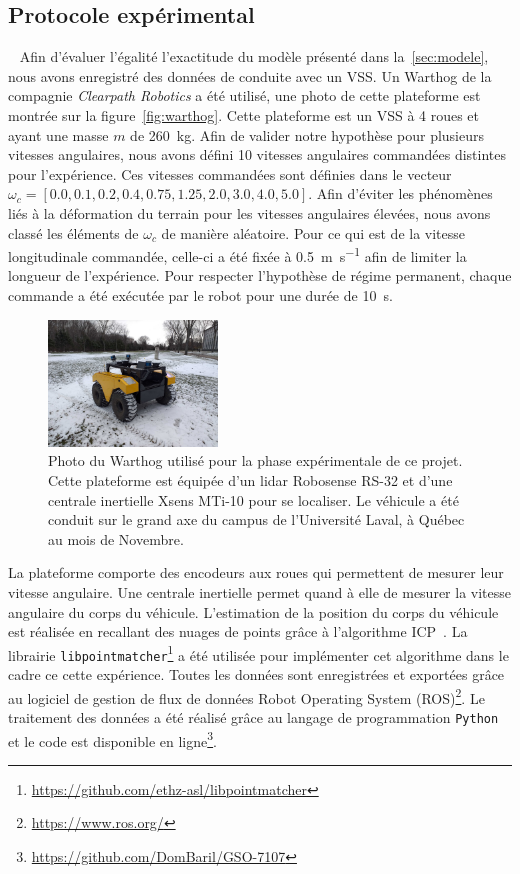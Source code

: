 \subsection{Protocole expérimental}~\label{sec:protocole}
Afin d'évaluer l'égalité l'exactitude du modèle présenté dans la~\autoref{sec:modele}, nous avons enregistré des données de conduite avec un \ac{VSS}. 
Un Warthog de la compagnie \textit{Clearpath Robotics} a été utilisé, une photo de cette plateforme est montrée sur la figure~\autoref{fig:warthog}.
Cette plateforme est un \ac{VSS} à 4 roues et ayant une masse $m$ de \SI{260}{\kg}.
Afin de valider notre hypothèse pour plusieurs vitesses angulaires, nous avons défini 10 vitesses angulaires commandées distintes pour l'expérience.
Ces vitesses commandées sont définies dans le vecteur $\omega_c = [0.0, 0.1, 0.2, 0.4, 0.75 ,1.25, 2.0, 3.0, 4.0, 5.0]$.
Afin d'éviter les phénomènes liés à la déformation du terrain pour les vitesses angulaires élevées, nous avons classé les éléments de $\omega_c$ de manière aléatoire.
Pour ce qui est de la vitesse longitudinale commandée, celle-ci a été fixée à \SI{0.5}{\m\per\second} afin de limiter la longueur de l'expérience.
Pour respecter l'hypothèse de régime permanent, chaque commande a été exécutée par le robot pour une durée de \SI{10}{\second}.

\begin{figure}[htpb]
	\centering
	\includegraphics[width=0.4\textwidth]{figs/warthog.pdf}
	\caption{Photo du Warthog utilisé pour la phase expérimentale de ce projet.
		Cette plateforme est équipée d'un lidar Robosense RS-32 et d'une centrale inertielle Xsens MTi-10 pour se localiser.
		Le véhicule a été conduit sur le grand axe du campus de l'Université Laval, à Québec au mois de Novembre.}
	\label{fig:warthog}
\end{figure}

La plateforme comporte des encodeurs aux roues qui permettent de mesurer leur vitesse angulaire.
Une centrale inertielle permet quand à elle de mesurer la vitesse angulaire du corps du véhicule.
L'estimation de la position du corps du véhicule est réalisée en recallant des nuages de points grâce à l'algorithme \ac{ICP}~\citep{Pomerleau2015}.
La librairie \texttt{libpointmatcher}\footnote{\url{https://github.com/ethz-asl/libpointmatcher}} a été utilisée pour implémenter cet algorithme dans le cadre ce cette expérience.
Toutes les données sont enregistrées et exportées grâce au logiciel de gestion de flux de données Robot Operating System (ROS)\footnote{\url{https://www.ros.org/}}.
Le traitement des données a été réalisé grâce au langage de programmation \texttt{Python} et le code est disponible en ligne\footnote{\url{https://github.com/DomBaril/GSO-7107}}.